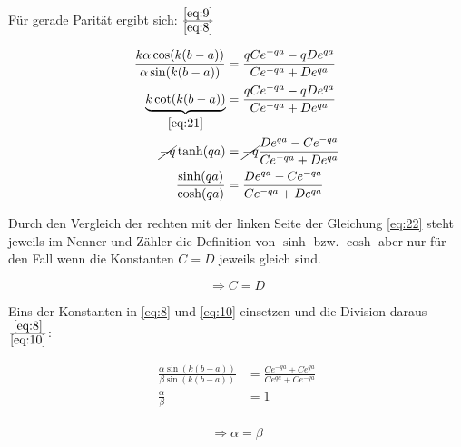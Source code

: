 Für gerade Parität ergibt sich:
\(\frac{\eqref{eq:9}}{\eqref{eq:8}}\)

\begin{align}  
  \frac{k\alpha\cos(k(b-a))}{\alpha\sin(k(b-a))} &= \frac{qCe^{-qa}-qDe^{qa}}{Ce^{-qa}+De^{qa}}\\
\underbrace{k\cot(k(b-a))}_{\eqref{eq:21}} &= \frac{qCe^{-qa}-qDe^{qa}}{Ce^{-qa}+De^{qa}}\\
\cancel{-q} \tanh(qa) &=\cancel{ -q} \frac{De^{qa}-Ce^{-qa}}{Ce^{-qa}+De^{qa}}\\
\frac{\sinh(qa)}{\cosh(qa)} &= \frac{De^{qa}-Ce^{-qa}}{Ce^{-qa}+De^{qa}}\label{eq:22}
\end{align}

Durch den Vergleich der rechten mit der linken Seite der Gleichung \eqref{eq:22} steht jeweils im Nenner und Zähler die Definition von \(\sinh\) bzw. \(\cosh\) aber nur für den Fall wenn die Konstanten \(C=D\) jeweils gleich sind.

\[\Rightarrow C=D\]

Eins der Konstanten in \eqref{eq:8} und  \eqref{eq:10} einsetzen und die Division daraus \(\frac{\eqref{eq:8}}{\eqref{eq:10}}\):

\begin{align}
  \label{eq:23}
\frac{\alpha\sin(k(b-a))}{\beta\sin(k(b-a))} &= \frac{Ce^{-qa}+Ce^{qa}}{ Ce^{qa}+Ce^{-qa}}\\
\frac{\alpha}{\beta} &= 1\\
\end{align}

\begin{equation}
  \label{eq:24}
 \Rightarrow  \alpha = \beta
\end{equation}


